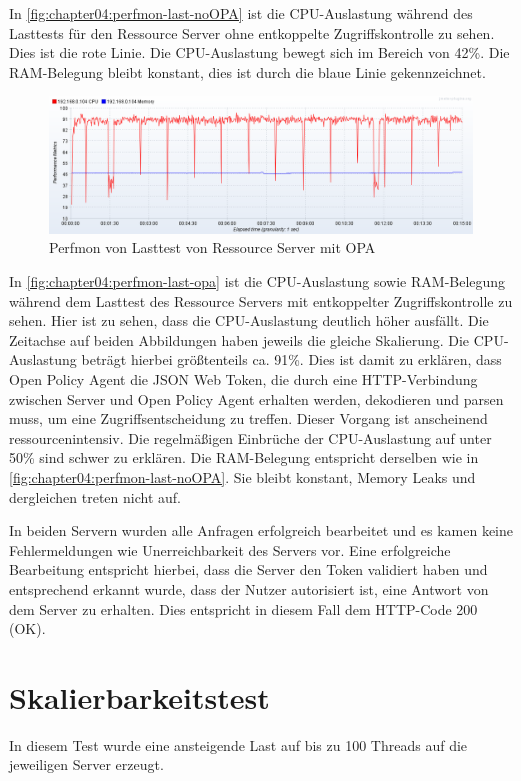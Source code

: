 In \autoref{fig:chapter04:perfmon-last-noOPA} ist die CPU-Auslastung während des Lasttests für den Ressource Server ohne entkoppelte Zugriffskontrolle zu sehen. Dies ist die rote Linie. Die CPU-Auslastung bewegt sich im Bereich von 42\%. Die RAM-Belegung bleibt konstant, dies ist durch die blaue Linie gekennzeichnet. 

\begin{figure}[H]
  \centering
  \includegraphics[width=1.0\textwidth]{gfx/perfmon-last-opa.png}
  \caption{Perfmon von Lasttest von Ressource Server mit OPA}
  \label{fig:chapter04:perfmon-last-opa}
\end{figure}

In \autoref{fig:chapter04:perfmon-last-opa} ist die CPU-Auslastung sowie RAM-Belegung während dem Lasttest des Ressource Servers mit entkoppelter Zugriffskontrolle zu sehen. Hier ist zu sehen, dass die CPU-Auslastung deutlich höher ausfällt. Die Zeitachse auf beiden Abbildungen haben jeweils die gleiche Skalierung. Die CPU-Auslastung beträgt hierbei größtenteils ca. 91\%. Dies ist damit zu erklären, dass Open Policy Agent die JSON Web Token, die durch eine HTTP-Verbindung zwischen Server und Open Policy Agent erhalten werden, dekodieren und parsen muss, um eine Zugriffsentscheidung zu treffen. Dieser Vorgang ist anscheinend ressourcenintensiv. Die regelmäßigen Einbrüche der CPU-Auslastung auf unter 50\% sind schwer zu erklären. Die RAM-Belegung entspricht derselben wie in \autoref{fig:chapter04:perfmon-last-noOPA}. Sie bleibt konstant, Memory Leaks und dergleichen treten nicht auf.\smallskip

In beiden Servern wurden alle Anfragen erfolgreich bearbeitet und es kamen keine Fehlermeldungen wie Unerreichbarkeit des Servers vor. Eine erfolgreiche Bearbeitung entspricht hierbei, dass die Server den Token validiert haben und entsprechend erkannt wurde, dass der Nutzer autorisiert ist, eine Antwort von dem Server zu erhalten. Dies entspricht in diesem Fall dem HTTP-Code 200 (OK). 

\section{Skalierbarkeitstest}
In diesem Test wurde eine ansteigende Last auf bis zu 100 Threads auf die jeweiligen Server erzeugt. 

